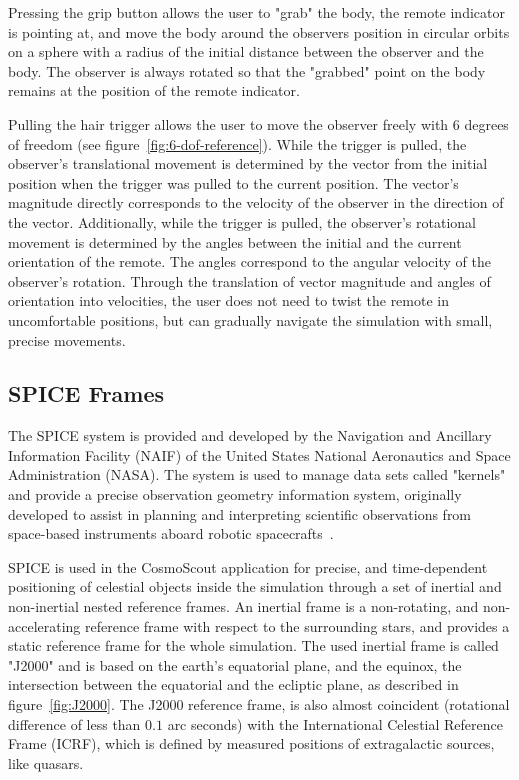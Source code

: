 Pressing the grip button allows the user to "grab" the body, the remote indicator is pointing at, and move the body
around the observers position in circular orbits on a sphere with a radius of the initial distance between the
observer and the body.
The observer is always rotated so that the "grabbed" point on the body remains at the position of the remote indicator.

Pulling the hair trigger allows the user to move the observer freely with 6 degrees of freedom (see
figure~\ref{fig:6-dof-reference}).
While the trigger is pulled, the observer's translational movement is determined by the vector from the initial
position when the trigger was pulled to the current position.
The vector's magnitude directly corresponds to the velocity of the observer in the direction of the vector.
Additionally, while the trigger is pulled, the observer's rotational movement is determined by the angles between the
initial and the current orientation of the remote.
The angles correspond to the angular velocity of the observer's rotation.
Through the translation of vector magnitude and angles of orientation into velocities, the user does not need to
twist the remote in uncomfortable positions, but can gradually navigate the simulation with small, precise movements.


\subsection{SPICE Frames}\label{subsec:spice-frames}

The SPICE system is provided and developed by the Navigation and Ancillary Information Facility (NAIF) of the United
States National Aeronautics and Space Administration (NASA).
The system is used to manage data sets called "kernels" and provide a precise observation geometry information 
system, originally developed to assist in planning and interpreting scientific observations from space-based 
instruments aboard robotic spacecrafts~\cite{NAIFbook, NAIFhomepage}.

SPICE is used in the CosmoScout application for precise, and time-dependent positioning of celestial objects inside
the simulation through a set of inertial and non-inertial nested reference frames.
An inertial frame is a non-rotating, and non-accelerating reference frame with respect to the surrounding stars, and
provides a static reference frame for the whole simulation.
The used inertial frame is called "J2000" and is based on the earth's equatorial plane, and the equinox, the 
intersection between the equatorial and the ecliptic plane, as described in figure~\ref{fig:J2000}.
The J2000 reference frame, is also almost coincident (rotational difference of less than $0.1$ arc seconds) with the
International Celestial Reference Frame (ICRF), which is defined by measured positions of extragalactic sources, like
quasars.


